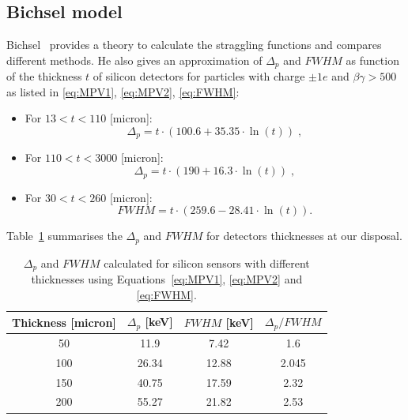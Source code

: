 \subsection{Bichsel model}
Bichsel~\cite{Bichsel} provides a theory to calculate the
straggling functions and compares different methods. He also gives an
approximation of $\Delta_{p}$ and $FWHM$ as function of the thickness
$t$ of silicon detectors for particles with charge $\pm1e$ and
$\beta\gamma>500$ as listed in \cref{eq:MPV1}, \cref{eq:MPV2},
\cref{eq:FWHM}:

\begin{itemize}
\item For $13<t<110$ [micron]:
  \begin{equation}
    \Delta_{p}=t \cdot (100.6+35.35 \cdot \ln(t))\; ,
    \label{eq:MPV1}
  \end{equation}
\item For $110<t<3000$ [micron]:
  \begin{equation}
    \Delta_{p}=t \cdot (190+16.3 \cdot \ln(t))\; ,
    \label{eq:MPV2}
  \end{equation}
\item For $30<t<260$ [micron]:
  \begin{equation}
    FWHM=t \cdot (259.6-28.41 \cdot \ln(t)).
    \label{eq:FWHM}
  \end{equation}
\end{itemize}

Table~\ref{tab:EdepForDifferentThickness} summarises the $\Delta_{p}$
and $FWHM$ for detectors thicknesses at our disposal. 

\begin{table}[htbp]
  \centering
  \caption{$\Delta_{p}$ and $FWHM$ calculated for silicon sensors with
    different thicknesses using Equations~\ref{eq:MPV1}, \ref{eq:MPV2}
    and \ref{eq:FWHM}.}
  \label{tab:EdepForDifferentThickness}
  \begin{tabular}{c c c c}
    \toprule
    Thickness [micron] &  $\Delta_{p}$ [keV] & $FWHM$ [keV] & $\Delta_{p} / FWHM$ \\ 
    \midrule
    50 & 11.9 & 7.42 & 1.6      \\
    100 & 26.34 & 12.88 & 2.045 \\
    150 & 40.75 & 17.59 & 2.32  \\
    200 & 55.27 & 21.82 & 2.53  \\
    \bottomrule
  \end{tabular}
\end{table}


